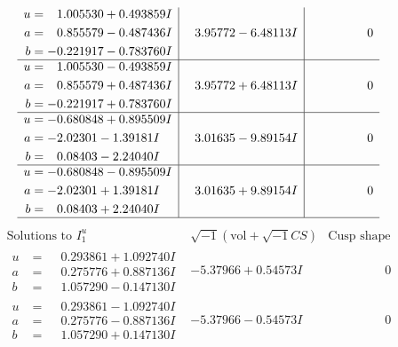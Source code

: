 \documentclass[1p]{elsarticle_modified}
\theoremstyle{definition}
\newcommand{\I}{\sqrt{-1}}
\begin{document}
$$\begin{array}{c|c|c}
\begin{aligned}
u &= \phantom{-}1.005530 + 0.493859 I \\
a &= \phantom{-}0.855579 - 0.487436 I \\
b &= -0.221917 - 0.783760 I\end{aligned}
 & \phantom{-}3.95772 - 6.48113 I & \phantom{-0.000000 } 0 \\ \hline\begin{aligned}
u &= \phantom{-}1.005530 - 0.493859 I \\
a &= \phantom{-}0.855579 + 0.487436 I \\
b &= -0.221917 + 0.783760 I\end{aligned}
 & \phantom{-}3.95772 + 6.48113 I & \phantom{-0.000000 } 0 \\ \hline\begin{aligned}
u &= -0.680848 + 0.895509 I \\
a &= -2.02301 - 1.39181 I \\
b &= \phantom{-}0.08403 - 2.24040 I\end{aligned}
 & \phantom{-}3.01635 - 9.89154 I & \phantom{-0.000000 } 0 \\ \hline\begin{aligned}
u &= -0.680848 - 0.895509 I \\
a &= -2.02301 + 1.39181 I \\
b &= \phantom{-}0.08403 + 2.24040 I\end{aligned}
 & \phantom{-}3.01635 + 9.89154 I & \phantom{-0.000000 } 0\\
 \hline 
 \end{array}$$\newpage$$\begin{array}{c|c|c}  
\text{Solutions to }I^u_{1}& \I (\text{vol} + \sqrt{-1}CS) & \text{Cusp shape}\\
 \hline 
\begin{aligned}
u &= \phantom{-}0.293861 + 1.092740 I \\
a &= \phantom{-}0.275776 + 0.887136 I \\
b &= \phantom{-}1.057290 - 0.147130 I\end{aligned}
 & -5.37966 + 0.54573 I & \phantom{-0.000000 } 0 \\ \hline\begin{aligned}
u &= \phantom{-}0.293861 - 1.092740 I \\
a &= \phantom{-}0.275776 - 0.887136 I \\
b &= \phantom{-}1.057290 + 0.147130 I\end{aligned}
 & -5.37966 - 0.54573 I & \phantom{-0.000000 } 0 \\ \hline\begin{aligned}

\end{aligned}
\end{array}$$
\end{document}

